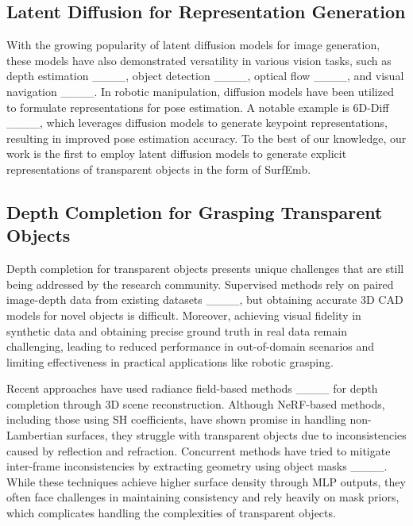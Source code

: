 \subsection{Latent Diffusion for Representation Generation}

With the growing popularity of latent diffusion models for image generation, these models have also demonstrated versatility in various vision tasks, such as depth estimation ____, object detection ____, optical flow ____, and visual navigation ____. In robotic manipulation, diffusion models have been utilized to formulate representations for pose estimation. A notable example is 6D-Diff ____, which leverages diffusion models to generate keypoint representations, resulting in improved pose estimation accuracy. To the best of our knowledge, our work is the first to employ latent diffusion models to generate explicit representations of transparent objects in the form of SurfEmb.

\subsection{Depth Completion for Grasping Transparent Objects}


Depth completion for transparent objects presents unique challenges that are still being addressed by the research community. Supervised methods rely on paired image-depth data from existing datasets ____, but obtaining accurate 3D CAD models for novel objects is difficult. Moreover, achieving visual fidelity in synthetic data and obtaining precise ground truth in real data remain challenging, leading to reduced performance in out-of-domain scenarios and limiting effectiveness in practical applications like robotic grasping.

Recent approaches have used radiance field-based methods ____ for depth completion through 3D scene reconstruction. Although \ac{NeRF}-based methods, including those using \ac{SH} coefficients, have shown promise in handling non-Lambertian surfaces, they struggle with transparent objects due to inconsistencies caused by reflection and refraction. Concurrent methods have tried to mitigate inter-frame inconsistencies by extracting geometry using object masks ____. While these techniques achieve higher surface density through MLP outputs, they often face challenges in maintaining consistency and rely heavily on mask priors, which complicates handling the complexities of transparent objects.